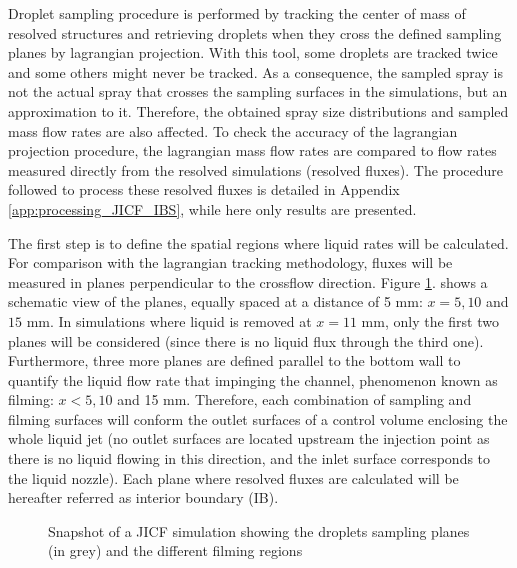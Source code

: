 Droplet sampling procedure is performed by tracking the center of mass of resolved structures and retrieving droplets when they cross the defined sampling planes by lagrangian projection. With this tool, some droplets are tracked twice and some others might never be tracked. As a consequence, the sampled spray is not the actual spray that crosses the sampling surfaces in the simulations, but an approximation to it. Therefore, the obtained spray size distributions and sampled mass flow rates are also affected. To check the accuracy of the lagrangian projection procedure, the lagrangian mass flow rates are compared to flow rates measured directly from the resolved simulations (resolved fluxes). The procedure followed to process these resolved fluxes is detailed in Appendix \ref{app:processing_JICF_IBS}, while here only results are presented. 

The first step is to define the spatial regions where liquid rates will be calculated. For comparison with the lagrangian tracking methodology, fluxes will be measured in planes perpendicular to the crossflow direction. Figure \ref{fig:jicf_interior_boundaries_surface_measurements}.  shows a schematic view of the planes, equally spaced at a distance of 5 mm: $x = 5, 10$ and $15$ mm. In simulations where liquid is removed at $x = 11$ mm, only the first two planes will be considered (since there is  no liquid flux through the third one). Furthermore, three more planes are defined parallel to the bottom wall to quantify the liquid flow rate that impinging the channel, phenomenon known as filming: $x < 5, 10$ and 15 mm. Therefore, each combination of sampling and filming surfaces will conform the outlet surfaces of a control volume enclosing the whole liquid jet (no outlet surfaces are located upstream the injection point as there is no liquid flowing in this direction, and the inlet surface corresponds to the liquid
nozzle). Each plane where resolved fluxes are calculated will be hereafter referred as interior boundary (IB).

\clearpage

\begin{figure}[ht]
     \centering
     \caption{Snapshot of a JICF simulation showing the droplets sampling planes (in grey) and the different filming regions}
      \label{fig:jicf_interior_boundaries_surface_measurements}
\end{figure}

